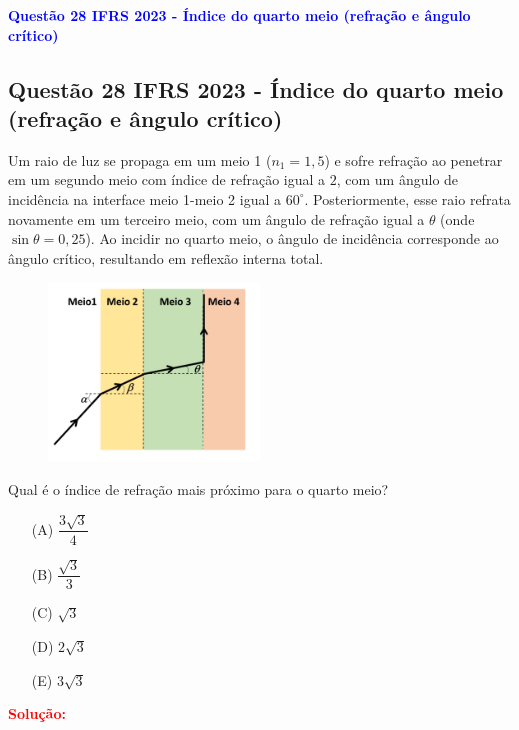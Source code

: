 \begin{flushleft}
\textbf{\textcolor{blue}{\Large Quest\~ao 28 IFRS 2023 - Índice do quarto meio (refração e ângulo crítico)}}\\
\noindent

\subsection{Quest\~ao 28 IFRS 2023 - Índice do quarto meio (refração e ângulo crítico)}

Um raio de luz se propaga em um meio 1 ($n_1=1{,}5$) e sofre refração ao penetrar em um segundo meio com índice de refração igual a 
$2$, com um ângulo de incidência na interface meio 1-meio 2 igual a $60^\circ$. Posteriormente, esse raio refrata novamente em um terceiro 
meio, com um ângulo de refração igual a $\theta$ (onde $\sin\theta=0{,}25$). Ao incidir no quarto meio, o ângulo de incidência corresponde ao ângulo crítico, 
resultando em reflexão interna total.

\begin{figure}[!h]
\centering
\includegraphics[width=0.5\textwidth]{figures/lei_snell.png} 
\end{figure}

Qual é o índice de refração mais próximo para o quarto meio?

\begin{itemize}
\item[(A)] $\dfrac{3\sqrt{3}}{4}$
\item[(B)] $\dfrac{\sqrt{3}}{3}$
\item[(C)] $\sqrt{3}$
\item[(D)] $2\sqrt{3}$
\item[(E)] $3\sqrt{3}$
\end{itemize}

\vspace{0.5cm}

\textcolor{red}{\textbf{Solução:}}\\[2mm]


\end{flushleft}
